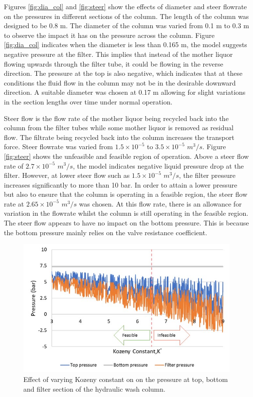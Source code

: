 Figures \ref{fig:dia_col} and \ref{fig:steer} show the effects of diameter and steer flowrate on the pressures in different sections of the column. The length of the column was designed to be 0.8 m. The diameter of the column was varied from 0.1 m to 0.3 m to observe the impact it has on the pressure across the column. Figure \ref{fig:dia_col} indicates when the diameter is less than 0.165 m, the model suggests negative pressure at the filter. This implies that instead of the mother liquor flowing upwards through the filter tube, it could be flowing in the reverse direction. The pressure at the top is also negative, which indicates that at these conditions the fluid flow in the column may not be in the desirable downward direction. A suitable diameter was chosen at 0.17 m allowing for slight variations in the section lengths over time under normal operation.

Steer flow is the flow rate of the mother liquor being recycled back into the column from the filter tubes while some mother liquor is removed as residual flow. The filtrate being recycled back into the column increases the transport force. Steer flowrate was varied from $1.5 \times 10^{-5}$ to $3.5 \times 10^{-5}$ $m^{3}/s$. Figure \ref{fig:steer} shows the unfeasible and feasible region of operation. Above a steer flow rate of $2.7 \times 10^{-5}$ $m^{3}/s$, the model indicates negative liquid pressure drop at the filter. However, at lower steer flow such as $1.5 \times 10^{-5}$ $m^{3}/s$, the filter pressure increases significantly to more than 10 bar. In order to attain a lower pressure but also to ensure that the column is operating in a feasible region, the steer flow rate at $2.65 \times 10^{-5}$ $m^{3}/s$ was chosen. At this flow rate, there is an allowance for variation in the flowrate whilst the column is still operating in the feasible region. The steer flow appears to have no impact on the bottom pressure. This is because the bottom pressure mainly relies on the valve resistance coefficient. 

\begin{figure}
\centering
\includegraphics[width=\linewidth]{chapters/3-separation/figures/kozeny.jpg}
\caption{Effect of varying Kozeny constant on  on the pressure at top, bottom and filter section of the hydraulic wash column.}
\label{fig:koz_col}
\end{figure}


